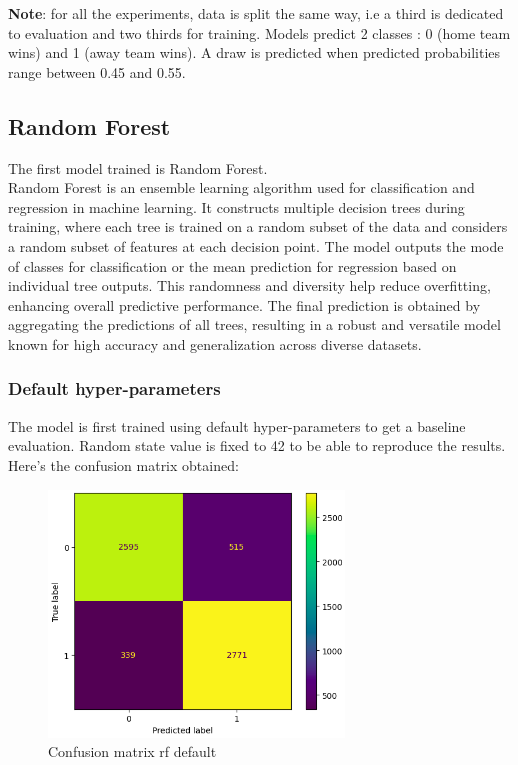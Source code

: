 \documentclass[a4paper,12pt]{article}
\begin{document}
\textbf{Note}: for all the experiments, data is split the same way, i.e a third is dedicated to evaluation and two thirds for training. Models predict 2 classes : 0 (home team wins) and 1 (away team wins). A draw is predicted when predicted probabilities range between 0.45 and 0.55.
\subsection{Random Forest}

The first model trained is Random Forest.\\

Random Forest is an ensemble learning algorithm used for classification and regression in machine learning. It constructs multiple decision trees during training, where each tree is trained on a random subset of the data and considers a random subset of features at each decision point. The model outputs the mode of classes for classification or the mean prediction for regression based on individual tree outputs. This randomness and diversity help reduce overfitting, enhancing overall predictive performance. The final prediction is obtained by aggregating the predictions of all trees, resulting in a robust and versatile model known for high accuracy and generalization across diverse datasets.\\

\subsubsection{Default hyper-parameters}

The model is first trained using default hyper-parameters to get a baseline evaluation. Random state value is fixed to 42 to be able to reproduce the results.\\

Here's the confusion matrix obtained:

\begin{figure}[H]
  \centering
  \includegraphics[width=0.7\textwidth]{./images/cm_rf_default.png}
  \caption{Confusion matrix rf default}
  \label{fig:cm_rf_default}
\end{figure}
\end{document}
